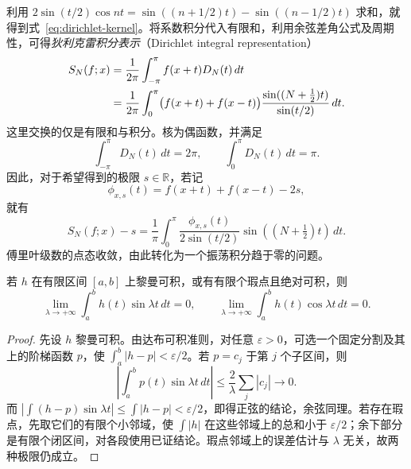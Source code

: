 \documentclass[UTF8,12pt,a4paper,fontset=fandol]{ctexbook}
\begin{document}
利用 $2\sin(t/2)\cos nt=\sin((n+1/2)t)-\sin((n-1/2)t)$ 求和，就得到式~\eqref{eq:dirichlet-kernel}。将系数积分代入有限和，利用余弦差角公式及周期性，可得\emph{狄利克雷积分表示}（Dirichlet integral representation）
\begin{align}
    S_N(f;x)&=\frac1{2\pi}\int_{-\pi}^{\pi}f(x+t)D_N(t)\,dt\notag\\
       &=\frac1{2\pi}\int_0^\pi
         \bigl(f(x+t)+f(x-t)\bigr)
         \frac{\sin((N+\tfrac12)t)}{\sin(t/2)}\,dt.
    \label{eq:dirichlet-integral-representation}
\end{align}
这里交换的仅是有限和与积分。核为偶函数，并满足
\begin{equation}
    \int_{-\pi}^{\pi}D_N(t)\,dt=2\pi,
    \qquad \int_0^\pi D_N(t)\,dt=\pi.
    \label{eq:dirichlet-kernel-mass}
\end{equation}
因此，对于希望得到的极限 $s\in\mathbb R$，若记
\[
    \phi_{x,s}(t)=f(x+t)+f(x-t)-2s,
\]
就有
\begin{equation}
    S_N(f;x)-s=\frac1\pi\int_0^\pi
       \frac{\phi_{x,s}(t)}{2\sin(t/2)}
                    \sin((N+\tfrac12)t)\,dt.
    \label{eq:fourier-pointwise-error-integral}
\end{equation}
傅里叶级数的点态收敛，由此转化为一个振荡积分趋于零的问题。

\begin{lemma}[黎曼--勒贝格引理]
\label{lem:riemann-lebesgue-finite-integral}
若 $h$ 在有限区间 $[a,b]$ 上黎曼可积，或有有限个瑕点且绝对可积，则
\begin{equation}
    \lim_{\lambda\to+\infty}\int_a^bh(t)\sin\lambda t\,dt=0,
    \qquad
    \lim_{\lambda\to+\infty}\int_a^bh(t)\cos\lambda t\,dt=0.
    \label{eq:riemann-lebesgue-finite-integral}
\end{equation}
\end{lemma}

\begin{proof}
先设 $h$ 黎曼可积。由达布可积准则，对任意 $\varepsilon>0$，可选一个固定分割及其上的阶梯函数 $p$，使 $\int_a^b|h-p|<\varepsilon/2$。若 $p=c_j$ 于第 $j$ 个子区间，则
\[
    \left|\int_a^bp(t)\sin\lambda t\,dt\right|
        \leq\frac2\lambda\sum_j|c_j|\longrightarrow0.
\]
而 $|\int(h-p)\sin\lambda t|\leq\int|h-p|<\varepsilon/2$，即得正弦的结论，余弦同理。若存在瑕点，先取它们的有限个小邻域，使 $\int|h|$ 在这些邻域上的总和小于 $\varepsilon/2$；余下部分是有限个闭区间，对各段使用已证结论。瑕点邻域上的误差估计与 $\lambda$ 无关，故两种极限仍成立。
\end{proof}
\end{document}
